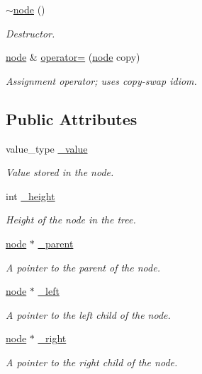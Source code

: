\begin{DoxyCompactItemize}
\item 
\hyperlink{structnode_a527872acc0945cc69fdcc1237112ea40}{$\sim$node} ()
\begin{DoxyCompactList}\small\item\em Destructor. \end{DoxyCompactList}\item 
\hyperlink{structnode}{node} \& \hyperlink{structnode_a88b75549d8936a1cdafd77d1daf9f218}{operator=} (\hyperlink{structnode}{node} copy)
\begin{DoxyCompactList}\small\item\em Assignment operator; uses copy-\/swap idiom. \end{DoxyCompactList}\end{DoxyCompactItemize}
\subsection*{Public Attributes}
\begin{DoxyCompactItemize}
\item 
value\+\_\+type \hyperlink{structnode_a8353cf23af61f2a637764a1a46ca8eb6}{\+\_\+value}
\begin{DoxyCompactList}\small\item\em Value stored in the node. \end{DoxyCompactList}\item 
int \hyperlink{structnode_a3acd2c366e647bce759f961f71ebf5b3}{\+\_\+height}
\begin{DoxyCompactList}\small\item\em Height of the node in the tree. \end{DoxyCompactList}\item 
\hyperlink{structnode}{node} $\ast$ \hyperlink{structnode_ad045681eca718a3867a16a9644aac2a6}{\+\_\+parent}
\begin{DoxyCompactList}\small\item\em A pointer to the parent of the node. \end{DoxyCompactList}\item 
\hyperlink{structnode}{node} $\ast$ \hyperlink{structnode_af082014da104d7b72a3b7299d027ffbb}{\+\_\+left}
\begin{DoxyCompactList}\small\item\em A pointer to the left child of the node. \end{DoxyCompactList}\item 
\hyperlink{structnode}{node} $\ast$ \hyperlink{structnode_aa65c4746c7391fb99f06fec3400addce}{\+\_\+right}
\begin{DoxyCompactList}\small\item\em A pointer to the right child of the node. \end{DoxyCompactList}\end{DoxyCompactItemize}
